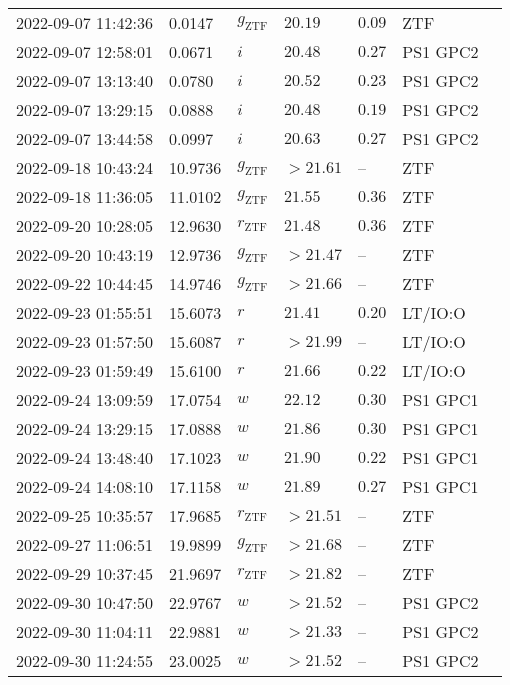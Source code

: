 \documentclass{nature_plusfigure}
\begin{document}
\begin{supplement}
\begin{center}
\begin{longtable}{lllllll}
2022-09-07 11:42:36 & 0.0147 & ${g}_\mathrm{ZTF}$ & $20.19$ & $0.09$ & ZTF &  \\ 
2022-09-07 12:58:01 & 0.0671 & $i$ & $20.48$ & $0.27$ & PS1 GPC2 &  \\ 
2022-09-07 13:13:40 & 0.0780 & $i$ & $20.52$ & $0.23$ & PS1 GPC2 &  \\ 
2022-09-07 13:29:15 & 0.0888 & $i$ & $20.48$ & $0.19$ & PS1 GPC2 &  \\ 
2022-09-07 13:44:58 & 0.0997 & $i$ & $20.63$ & $0.27$ & PS1 GPC2 &  \\ 
2022-09-18 10:43:24 & 10.9736 & ${g}_\mathrm{ZTF}$ & $>21.61$ & -- & ZTF &  \\ 
2022-09-18 11:36:05 & 11.0102 & ${g}_\mathrm{ZTF}$ & $21.55$ & $0.36$ & ZTF &  \\ 
2022-09-20 10:28:05 & 12.9630 & ${r}_\mathrm{ZTF}$ & $21.48$ & $0.36$ & ZTF &  \\ 
2022-09-20 10:43:19 & 12.9736 & ${g}_\mathrm{ZTF}$ & $>21.47$ & -- & ZTF &  \\ 
2022-09-22 10:44:45 & 14.9746 & ${g}_\mathrm{ZTF}$ & $>21.66$ & -- & ZTF &  \\ 
2022-09-23 01:55:51 & 15.6073 & $r$ & $21.41$ & $0.20$ & LT/IO:O &  \\ 
2022-09-23 01:57:50 & 15.6087 & $r$ & $>21.99$ & -- & LT/IO:O &  \\ 
2022-09-23 01:59:49 & 15.6100 & $r$ & $21.66$ & $0.22$ & LT/IO:O &  \\ 
2022-09-24 13:09:59 & 17.0754 & $w$ & $22.12$ & $0.30$ & PS1 GPC1 &  \\ 
2022-09-24 13:29:15 & 17.0888 & $w$ & $21.86$ & $0.30$ & PS1 GPC1 &  \\ 
2022-09-24 13:48:40 & 17.1023 & $w$ & $21.90$ & $0.22$ & PS1 GPC1 &  \\ 
2022-09-24 14:08:10 & 17.1158 & $w$ & $21.89$ & $0.27$ & PS1 GPC1 &  \\ 
2022-09-25 10:35:57 & 17.9685 & ${r}_\mathrm{ZTF}$ & $>21.51$ & -- & ZTF &  \\ 
2022-09-27 11:06:51 & 19.9899 & ${g}_\mathrm{ZTF}$ & $>21.68$ & -- & ZTF &  \\ 
2022-09-29 10:37:45 & 21.9697 & ${r}_\mathrm{ZTF}$ & $>21.82$ & -- & ZTF &  \\ 
2022-09-30 10:47:50 & 22.9767 & $w$ & $>21.52$ & -- & PS1 GPC2 &  \\ 
2022-09-30 11:04:11 & 22.9881 & $w$ & $>21.33$ & -- & PS1 GPC2 &  \\ 
2022-09-30 11:24:55 & 23.0025 & $w$ & $>21.52$ & -- & PS1 GPC2 &  \\ 

\end{longtable}
\end{center}
\end{supplement}
\end{document}
